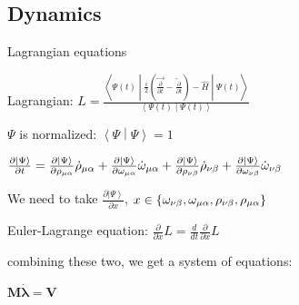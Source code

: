 \documentclass[professionalfonts]{beamer}
\newcommand{\ket}[1]{\ensuremath{\left|#1\right\rangle}}
\newcommand{\braket}[2]{\left< #1 \middle\vert #2 \right>}
\newcommand{\sandwich}[3]{\left< #1 \middle\vert #2 \middle\vert #3 \right>}
\newcommand{\ddt}{\frac{d}{dt}}
\newcommand{\pd}[1]{\frac{\partial}{\partial #1}}
\newcommand{\kpp}[1]{\frac{\partial \ket\Psi}{\partial #1}}
\newcommand{\ind}[1]{{\uo #1 \oo #1}}
\newcommand{\uo}[1]{
		\IfEqCase{#1}{
			{0}{\mu}
			{1}{\nu}
			{2}{\xi}
		}[\PackageError{uo}{Undefined option to uo: #1}{}]
}
\newcommand{\oo}[1]{
		\IfEqCase{#1}{
			{0}{\alpha}
			{1}{\beta}
			{2}{\gamma}
		}[\PackageError{unocorb}{Undefined option to unuo: #1}{}]
}
\newcommand{\SubItem}[1]{
    {\setlength\itemindent{15pt} \item[*] #1}
}
\begin{document}

\subsection {\textbf{Dynamics}}

\begin{frame}{Lagrangian equations}
	\begin{itemize}
		\item Lagrangian:
		\(
	L = \frac{\sandwich{\Psi(t)}{\frac{i}{2}\left(\overrightarrow{\pd t} - \overleftarrow{\pd t}\right) - \hat H}{\Psi(t)}}{\braket{\Psi(t)}{\Psi(t)}}
			\)
			\SubItem{$\Psi$ is normalized: $\braket \Psi \Psi = 1$}
			\SubItem{\(
				{\kpp t} = \kpp {\rho_\ind 0 }\dot \rho_\ind 0
	+	\kpp {\omega_\ind 0}\dot \omega_\ind 0
	+	\kpp {\rho_\ind 1 }\dot \rho_\ind 1
	+	\kpp {\omega_\ind 1}\dot \omega_\ind 1
			\)}
			\SubItem{We need to take $\kpp{x}$, $x \in \{\omega_\ind 1, \omega_\ind 0, \rho_\ind 1, \rho_\ind 0\}$}
		\item Euler-Lagrange equation:
		\(
				\pd{x} L = \ddt \pd{\dot x} L
			\)
		\item combining these two, we get a system of equations:
		\SubItem{\(
			\bm M \dot{\bm \lambda} = \bm V
		\)}
	\end{itemize}
\end{frame}
\end{document}
